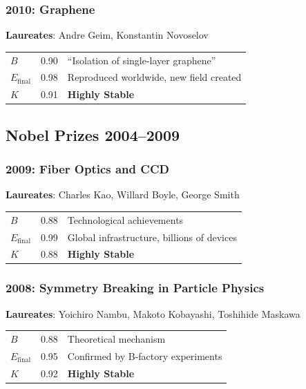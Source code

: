 \documentclass[11pt,a4paper]{article}
\begin{document}
\subsubsection{2010: Graphene}
\textbf{Laureates}: Andre Geim, Konstantin Novoselov

\begin{center}
\begin{tabular}{lcl}
\toprule
$B$ & 0.90 & ``Isolation of single-layer graphene'' \\
$E_{\text{final}}$ & 0.98 & Reproduced worldwide, new field created \\
$K$ & 0.91 & \textbf{Highly Stable} \\
\bottomrule
\end{tabular}
\end{center}

\subsection{Nobel Prizes 2004--2009}

\subsubsection{2009: Fiber Optics and CCD}
\textbf{Laureates}: Charles Kao, Willard Boyle, George Smith

\begin{center}
\begin{tabular}{lcl}
\toprule
$B$ & 0.88 & Technological achievements \\
$E_{\text{final}}$ & 0.99 & Global infrastructure, billions of devices \\
$K$ & 0.88 & \textbf{Highly Stable} \\
\bottomrule
\end{tabular}
\end{center}

\subsubsection{2008: Symmetry Breaking in Particle Physics}
\textbf{Laureates}: Yoichiro Nambu, Makoto Kobayashi, Toshihide Maskawa

\begin{center}
\begin{tabular}{lcl}
\toprule
$B$ & 0.88 & Theoretical mechanism \\
$E_{\text{final}}$ & 0.95 & Confirmed by B-factory experiments \\
$K$ & 0.92 & \textbf{Highly Stable} \\
\bottomrule
\end{tabular}
\end{center}
\end{document}
